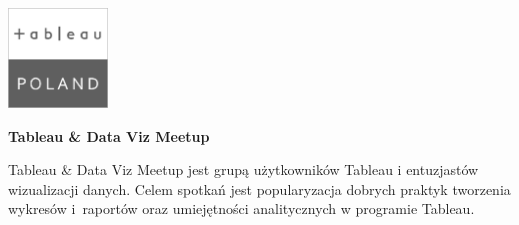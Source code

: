 \documentclass[\main/boa.tex]{subfiles}
\begin{document}
	
	\begin{minipage}[t]{0.915\textwidth}
		\center     
		\includegraphics[width=100px]{img/logos.bw/tableau.png} 
	\end{minipage}
	\begin{center}
	\Large \textbf {Tableau \& Data Viz Meetup}
	\end{center}
	
	\vskip 0.3cm
	\normalsize 
	Tableau \& Data Viz Meetup jest grupą użytkowników Tableau i entuzjastów wizualizacji danych. Celem spotkań jest popularyzacja dobrych praktyk tworzenia wykresów i~raportów oraz umiejętności analitycznych w programie Tableau.
	
	\vskip 1.5cm
\end{document}

